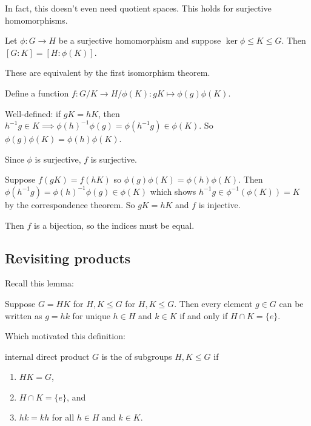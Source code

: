 \documentclass[12pt,letterpaper]{report}
\begin{document}
In fact, this doesn't even need quotient spaces.
This holds for surjective homomorphisms.

\begin{prop}{}{}
  Let $\phi \colon G \to H$ be a surjective homomorphism and suppose $\ker\phi \leq K \leq G$.
  Then $[G : K] = [H : \phi(K)]$.
\end{prop}

These are equivalent by the first isomorphism theorem.

\begin{thmproof}
  Define a function $f \colon G/K \to H/\phi(K) : gK \mapsto \phi(g)\phi(K)$.

  Well-defined: if $gK = hK$, then
  $h^{-1}g \in K \implies \phi(h)^{-1}\phi(g) = \phi(h^{-1}g) \in \phi(K)$.
  So $\phi(g)\phi(K) = \phi(h)\phi(K)$.

  Since $\phi$ is surjective, $f$ is surjective.

  Suppose $f(gK) = f(hK)$ so $\phi(g)\phi(K) = \phi(h)\phi(K)$.
  Then $\phi(h^{-1}g) = \phi(h)^{-1}\phi(g) \in \phi(K)$ which shows
  $h^{-1}g \in \phi^{-1}(\phi(K)) = K$ by the correspondence theorem.
  So $gK = hK$ and $f$ is injective.

  Then $f$ is a bijection, so the indices must be equal.
\end{thmproof}

\pagebreak
\subsection{Revisiting products}

Recall this lemma:

\begin{lem}{}{}
  Suppose $G = HK$ for $H, K \leq G$ for $H, K \leq G$.
  Then every element $g \in G$ can be written as $g = hk$ for unique $h \in H$ and $k \in K$ if and
  only if $H \cap K = \{e\}$.
\end{lem}

Which motivated this definition:

\begin{defn}{internal direct product}{}
  $G$ is the  of subgroups $H, K \leq G$ if
  \begin{enumerate}
    \item $HK = G$,
    \item $H \cap K = \{e\}$, and
    \item $hk = kh$ for all $h \in H$ and $k \in K$.
  \end{enumerate}
\end{defn}
\end{document}
